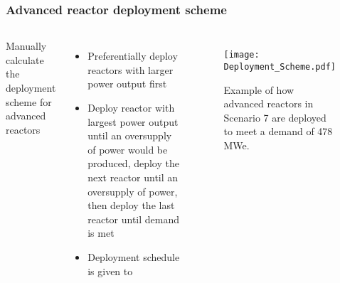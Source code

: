 \begin{frame}
    \frametitle{Advanced reactor deployment scheme}
    \begin{columns}
        \column[t]{5cm}
            Manually calculate the deployment scheme for advanced reactors
            \begin{itemize}
                \item Preferentially deploy reactors with larger power output first
                \item Deploy reactor with largest power output until an oversupply 
                      of power would be produced, deploy the next reactor until 
                      an oversupply of power, then deploy the last reactor until 
                      demand is met
                \item Deployment schedule is given to \Cyclus
            \end{itemize}
        \column[t]{5.5cm}
            \begin{figure}
                \texttt{[image: Deployment\_Scheme.pdf]}
                \caption{Example of how advanced reactors in Scenario 7 are deployed to 
                meet a demand of 478 MWe.}
                \label{fig:deployment}
            \end{figure}
                    
    \end{columns}
\end{frame}